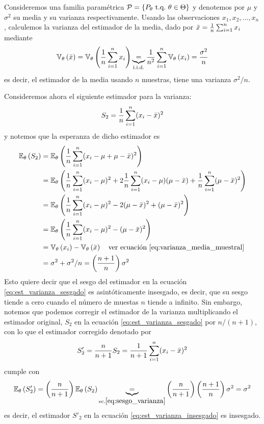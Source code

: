 \begin{example}
Consideremos una familia paramétrica $\mathcal{P} = \{P_\theta\ {\text{t.q.}}\ \theta\in\Theta\}$ y denotemos por $\mu$ y $\sigma^2$ su media y su varianza respectivamente. Usando las observaciones $x_1,x_2,\ldots,x_n$, calculemos la varianza del estimador de la media, dado por ${ \bar{x}} = \frac{1}{n}\sum_{i=1}^n x_i$ mediante
\begin{equation}
	\label{eq:varianza_media_muestral}
 	\mathbb{V}_\theta \left({ \bar{x}}\right) = \mathbb{V}_\theta \left(\frac{1}{n}	\sum_{i=1}^n x_i\right)  \underbrace{=}_{\text{i.i.d.}}  \frac{1}{n^2}	\sum_{i=1}^n\mathbb{V}_\theta \left( x_i\right) =\frac{\sigma^2}{n}
 \end{equation} 
 es decir, el estimador de la media usando $n$ muestras, tiene una varianza $\sigma^2/n$.

 Consideremos ahora el siguiente estimador para la varianza: 
\begin{equation}
	\label{eq:est_varianza_sesgado}
	S_2 = \frac{1}{n}\sum_{i=1}^n (x_i-{ \bar{x}})^2
\end{equation}
y notemos que la esperanza de dicho estimador es
\begin{align}
	\label{eq:sesgo_varianza}
	\mathbb{E}_\theta \left(S_2 \right) &= \mathbb{E}_\theta \left(\frac{1}{n}\sum_{i=1}^n (x_i-\mu+\mu-{ \bar{x}})^2\right)\nonumber\\
				&= \mathbb{E}_\theta \left( \frac{1}{n}\sum_{i=1}^n(x_i-\mu)^2 + 2\frac{1}{n}\sum_{i=1}^n(x_i-\mu)(\mu-{ \bar{x}}) + \frac{1}{n}\sum_{i=1}^n(\mu-{ \bar{x}})^2\right)\nonumber\\
				&= \mathbb{E}_\theta \left( \frac{1}{n}\sum_{i=1}^n(x_i-\mu)^2 - 2(\mu-{ \bar{x}})^2 + (\mu-{ \bar{x}})^2\right)\nonumber\\
				&= \mathbb{E}_\theta \left( \frac{1}{n}\sum_{i=1}^n(x_i-\mu)^2 - (\mu-{ \bar{x}})^2\right)\nonumber\\
				&= \mathbb{V}_\theta \left(x_i\right) - \mathbb{V}_\theta \left({ \bar{x}}\right)\quad\text{ver ecuación \eqref{eq:varianza_media_muestral}}\nonumber\\
				&= 	\sigma^2 + \sigma^2/n = \left(\frac{n+1}{n}\right)\sigma^2
\end{align}
Esto quiere decir que el sesgo del estimador en la ecuación \eqref{eq:est_varianza_sesgado} es asintóticamente insesgado, es decir, que su sesgo tiende a cero cuando el número de muestas $n$ tiende a infinito. Sin embargo, notemos que podemos corregir el estimador de la varianza multiplicando el estimador original, $S_2$ en la ecuación \eqref{eq:est_varianza_sesgado} por $n/(n+1)$, con lo que el estimador corregido denotado por 
\begin{equation}
	\label{eq:est_varianza_insesgado}
	S'_2 = \frac{n}{n+1}S_2 =  \frac{1}{n+1}\sum_{i=1}^n (x_i-{ \bar{x}})^2
\end{equation}
cumple con
\begin{equation}
	\mathbb{E}_\theta \left(S'_2 \right) =  \left(\frac{n}{n+1}\right)\mathbb{E}_\theta \left(S_2\right) \underbrace{=}_{\text{ec.}\eqref{eq:sesgo_varianza}} \left(\frac{n}{n+1}\right) \left(\frac{n+1}{n}\right)\sigma^2 = \sigma^2
\end{equation}
es decir, el estimador $S'_2$ en la ecuación \eqref{eq:est_varianza_insesgado} es insesgado.
\end{example}

